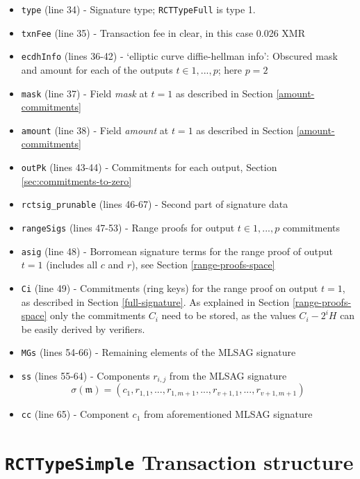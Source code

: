 \begin{appendices}
\begin{itemize}
	\item {\tt type} (line 34) - Signature type; {\tt RCTTypeFull} is type 1.
	\item {\tt txnFee} (line 35) - Transaction fee in clear, in this case 0.026 XMR
	\item {\tt ecdhInfo} (lines 36-42) - ‘elliptic curve diffie-hellman info’: Obscured mask and amount for each of the outputs $t \in {1, ..., p}$; here $p = 2$
	\item {\tt mask} (line 37) - Field {\sl mask} at $t = 1$ as described in Section \ref{amount-commitments}
    \item {\tt amount} (line 38) - Field {\sl amount} at $t = 1$ as described in Section \ref{amount-commitments}
    \item {\tt outPk} (lines 43-44) - Commitments for each output, Section \ref{sec:commitments-to-zero}
    
    \item {\tt rctsig\_prunable} (lines 46-67) - Second part of signature data
    \item {\tt rangeSigs} (lines 47-53) - Range proofs for output $t \in {1, ..., p}$ commitments 
    \item {\tt asig} (line 48) - Borromean signature terms for the range proof of output $t = 1$ (includes all $c$ and $r$), see Section \ref{range-proofs-space} 
    \item {\tt Ci} (line 49) -  Commitments (ring keys) for the range proof on output $t = 1$, as described in Section \ref{full-signature}. As explained in Section \ref{range-proofs-space} only the commitments $C_i$ need to be stored, as the values $C_i -2^i H$ can be easily derived by verifiers. 
    \item {\tt MGs} (lines 54-66) - Remaining elements of the MLSAG signature
    \item {\tt ss} (lines 55-64) - Components \(r_{i,j}\) from the MLSAG signature
      \[\sigma(\mathfrak{m}) = (c_1, r_{1, 1}, ..., r_{1, m+1}, ..., r_{v+1, 1}, ..., r_{v+1, m+1}) \]
    \item {\tt cc} (line 65) - Component \(c_1\) from aforementioned MLSAG signature
	
\end{itemize}





\chapter{{\tt RCTTypeSimple} Transaction structure}
\label{appendix:RCTTypeSimple}



\end{appendices}
